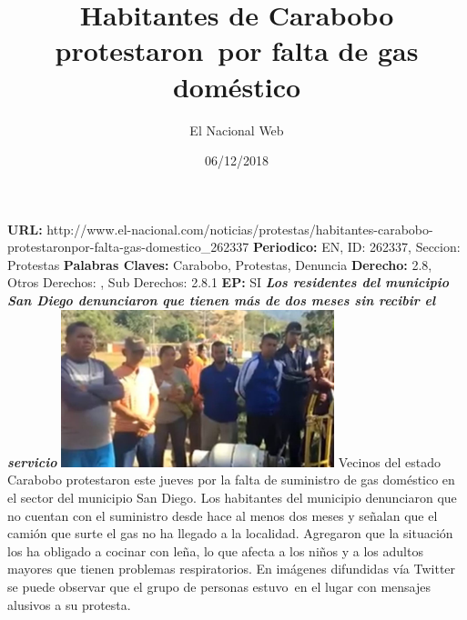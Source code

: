 \documentclass{article}%
\title{\textbf{Habitantes de Carabobo protestaron~por falta de gas doméstico}}%
\author{El Nacional Web}%
\date{06/12/2018}%
\begin{document}
%
\normalsize%
\maketitle%
\textbf{URL: }%
http://www.el{-}nacional.com/noticias/protestas/habitantes{-}carabobo{-}protestaronpor{-}falta{-}gas{-}domestico\_262337\newline%
%
\textbf{Periodico: }%
EN, %
ID: %
262337, %
Seccion: %
Protestas\newline%
%
\textbf{Palabras Claves: }%
Carabobo, Protestas, Denuncia\newline%
%
\textbf{Derecho: }%
2.8, %
Otros Derechos: %
, %
Sub Derechos: %
2.8.1\newline%
%
\textbf{EP: }%
SI\newline%
\newline%
%
\textbf{\textit{Los residentes del municipio San Diego denunciaron que tienen más de dos meses sin recibir el servicio}}%
\newline%
\newline%
%
\includegraphics[width=300px]{89.jpg}%
\newline%
%
Vecinos del estado Carabobo protestaron este jueves por la falta de suministro de gas doméstico en el sector del municipio San Diego.%
\newline%
%
Los habitantes del municipio denunciaron que no cuentan con el suministro desde hace al menos dos meses y señalan que el camión que surte el gas no ha llegado a la localidad.%
\newline%
%
Agregaron que la situación los ha obligado a cocinar con leña, lo que afecta a los niños y a los adultos mayores que tienen problemas respiratorios.%
\newline%
%
En imágenes difundidas vía Twitter se puede observar que el grupo de personas estuvo~en el lugar con mensajes alusivos a su protesta.%
\newline%
%
\end{document}
